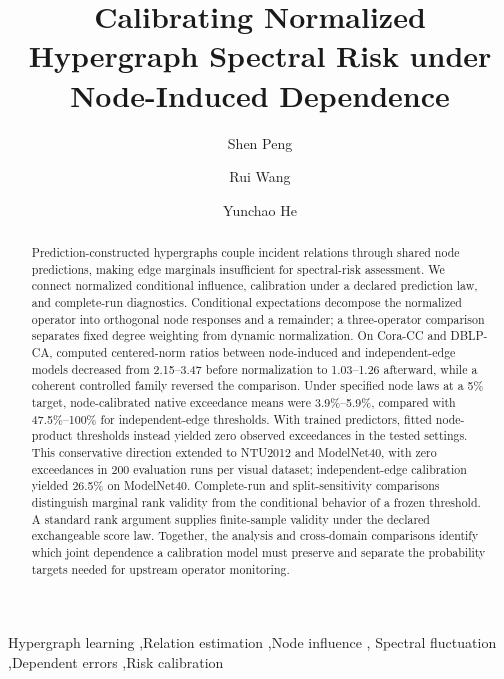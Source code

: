 \documentclass[preprint,11pt]{elsarticle}
\begin{document}
\begin{frontmatter}
\title{Calibrating Normalized Hypergraph Spectral Risk under Node-Induced Dependence}
\author[a]{Shen Peng}
\author[a]{Rui Wang}
\author[a]{Yunchao He}
\address[a]{Academy of Artificial Intelligence and Advanced Technology,
Xi'an Jiaotong-Liverpool University, Suzhou 215412, China}

\begin{abstract}
Prediction-constructed hypergraphs couple incident relations through
shared node predictions, making edge marginals insufficient for spectral-risk
assessment. We connect normalized conditional influence, calibration under a
declared prediction law, and complete-run diagnostics. Conditional
expectations decompose the normalized operator into orthogonal node
responses and a remainder; a three-operator comparison separates fixed
degree weighting from dynamic normalization. On Cora-CC and DBLP-CA,
computed centered-norm ratios between node-induced and independent-edge
models decreased from 2.15--3.47 before normalization to 1.03--1.26
afterward, while a coherent controlled family reversed the comparison.
Under specified node laws at a 5\% target, node-calibrated native
exceedance means were 3.9\%--5.9\%, compared with 47.5\%--100\% for
independent-edge thresholds. With trained predictors, fitted node-product
thresholds instead yielded zero observed exceedances in the tested
settings. This conservative direction extended to NTU2012 and ModelNet40,
with zero exceedances in 200 evaluation runs per visual dataset;
independent-edge calibration yielded 26.5\% on ModelNet40. Complete-run
and split-sensitivity comparisons distinguish marginal rank validity
from the conditional behavior of a frozen threshold. A standard rank
argument supplies finite-sample validity under the declared exchangeable
score law. Together, the analysis and cross-domain comparisons identify
which joint dependence a calibration model must preserve and separate
the probability targets needed for upstream operator monitoring.
\end{abstract}
\begin{keyword}
Hypergraph learning \sep Relation estimation \sep Node influence \sep
Spectral fluctuation \sep Dependent errors \sep Risk calibration
\end{keyword}
\end{frontmatter}


\end{document}
